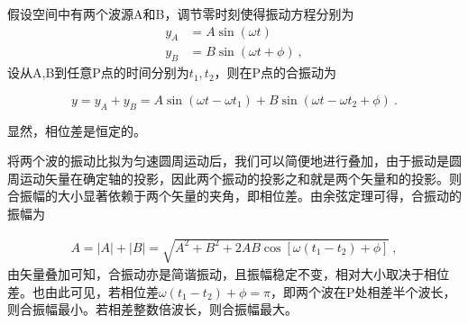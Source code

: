 假设空间中有两个波源A和B，调节零时刻使得振动方程分别为
\begin{equation}
\begin{aligned}
y_A&=A\sin(\omega t)\\
y_B&=B\sin (\omega t+\phi)~,
\end{aligned}
\end{equation}
设从A,B到任意P点的时间分别为$t_1,t_2$，则在P点的合振动为

\begin{equation}
y=y_A+y_B=A\sin(\omega t-\omega t_1)+B\sin(\omega t-\omega t_2+\phi)~.
\end{equation}

显然，相位差是恒定的。

将两个波的振动比拟为匀速圆周运动后，我们可以简便地进行叠加，由于振动是圆周运动矢量在确定轴的投影，因此两个振动的投影之和就是两个矢量和的投影。则合振幅的大小显著依赖于两个矢量的夹角，即相位差。由余弦定理可得，合振动的振幅为

\begin{equation}
\begin{aligned}
A=|A|+|B|=\sqrt{A^2+B^2+2AB\cos[\omega(t_1-t_2)+\phi]}~,
\end{aligned}
\end{equation}
由矢量叠加可知，合振动亦是简谐振动，且振幅稳定不变，相对大小取决于相位差。也由此可见，若相位差$\omega(t_1-t_2)+\phi=\pi$，即两个波在P处相差半个波长，则合振幅最小。若相差整数倍波长，则合振幅最大。